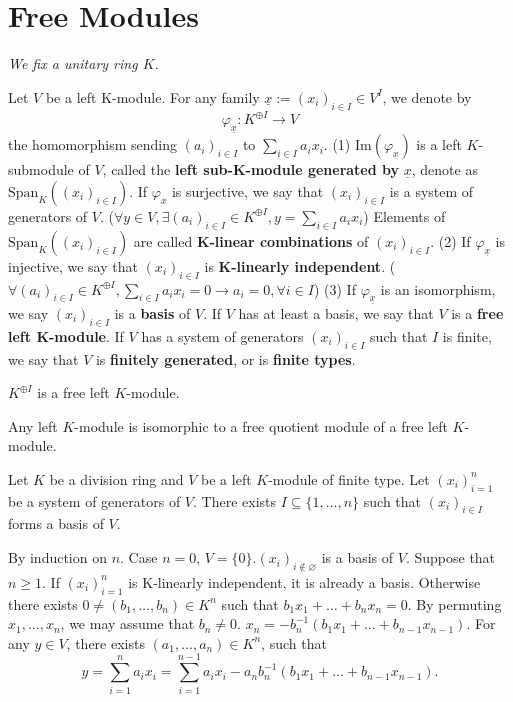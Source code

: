 \documentclass{book}
\numberwithin{equation}{section}
\begin{document}
\section{Free Modules}
\textit{We fix a unitary ring $K$.}
\begin{definitionenv}
    Let $V$ be a left K-module. For any family $\underline{x}:=\left(x_i\right)_{i\in I}\in V^I$, we denote by 
    $$\varphi_{\underline{x}}:K^{\oplus I}\longrightarrow V$$
    the homomorphism sending $(a_i)_{i\in I}$ to $\sum_{i\in I}a_ix_i.$
    \newline
    (1) $\mathrm{Im}\left(\varphi_{\underline{x}}\right)$ is a left $K$-submodule of $V$, called the \textbf{left sub-K-module generated by }$\underline{x}$, denote as $\mathrm{Span}_{K}\left((x_i)_{i\in I}\right)$. If $\varphi_{x}$ is surjective, we say that $(x_i)_{i\in I}$ is a system of generators of $V$.
    ($\forall y\in V,\exists (a_i)_{i\in I}\in K^{\oplus I}, y=\sum_{i\in I}a_ix_i$) Elements of $\mathrm{Span}_K\left((x_i)_{i\in I}\right)$ are called \textbf{K-linear combinations} of $(x_i)_{i\in I}$.
    \newline
    (2) If $\varphi_{\underline{x}}$ is injective, we say that $(x_i)_{i\in I}$ is \textbf{K-linearly independent}. ($\forall (a_i)_{i\in I}\in K^{\oplus I},\sum_{i\in I}a_ix_i=0\rightarrow a_i=0,\forall i\in I$)
    \newline
    (3) If $\varphi_{\underline{x}}$ is an isomorphism, we say $(x_i)_{i\in I}$ is a \textbf{basis} of $V$. If $V$ has at least a basis, we say that $V$ is a \textbf{free left K-module}. If $V$ has a system of generators $(x_i)_{i\in I}$ such that $I$ is finite, we say that $V$ is \textbf{finitely generated}, or is \textbf{finite types}.
\end{definitionenv}
\begin{exampleenv}
    $K^{\oplus I}$ is a free left $K$-module.
\end{exampleenv}
\begin{remark}
    Any left $K$-module is isomorphic to a free quotient module of a free left $K$-module.
\end{remark}
\begin{theoremenv}\label{6.10.4}
    Let $K$ be a division ring and $V$ be a left $K$-module of finite type. Let $(x_i)_{i=1}^n$ be a system of generators of $V$. There exists $I\subseteq\{1,\dots,n\}$ such that $(x_i)_{i\in I}$ forms a basis of $V$.
\end{theoremenv}
\begin{proofenv}
    By induction on $n$.
    \newline
    Case $n=0$, $V=\{0\}. (x_i)_{i\not\in \varnothing}$ is a basis of $V$. Suppose that $n\geq1$. If $(x_i)_{i=1}^n$  is K-linearly independent, it is already a basis. Otherwise there exists $0\not=(b_1,\dots,b_n)\in K^n$ such  that $b_1x_1+\dots+b_nx_n=0.$ By permuting $x_1,\dots,x_n$, we may assume that $b_n\not=0$. $x_n=-b_n^{-1}(b_1x_1+\dots+b_{n-1}x_{n-1})$. For any $y\in V$, there exists $(a_1,\dots,a_n)\in K^n$, such that 
    $$y=\sum_{i=1}^{n}a_ix_i=\sum_{i=1}^{n-1}a_ix_i-a_nb_n^{-1}\left(b_1x_1+\dots+b_{n-1}x_{n-1}\right).$$
\end{proofenv}
\end{document}
